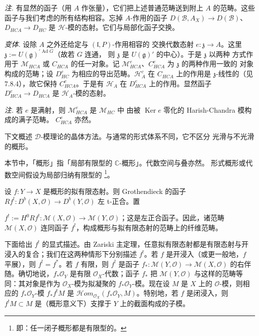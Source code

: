 \emph{注.} 有显然的函子（用 $A$ 作张量），它们把上述普通范畴送到附上 $A$
的范畴。这些函子与我们考虑的所有结构相容。忘掉 $A$-作用的函子
$D(\mathcal{B},A_{X})\to D(\mathcal{B})$、$D_{HCA}\to D_{HC}$ 是
$\mathcal{H}$-模的态射。它们与局部化函子交换。

 \emph{变体.} 设除 $A$ 之外还给定与 $(\mathfrak{l},P)$-作用相容的
交换代数态射 $e:\mathfrak{z}\to A$。这里
$\mathfrak{z}:=U(\mathfrak{g})^{\prime\operatorname{Ad}G}$（故若 $G$ 连通，
则 $\mathfrak{z}$ 是 $U(\mathfrak{g})'$ 的中心）。于是 $\mathfrak{z}$ 以两种
方式作用于 $\mathcal{M}_{HCA}$ 或 $C_{HCA}$ 的任一对象。记
$\mathcal{M}^{e}_{HCA}$、$C^{e}_{HCA}$ 为 $\mathfrak{z}$ 的两种作用一致的
对象构成的范畴；设 $D^{e}_{HC}$ 为相应的导出范畴。$\mathcal{H}^{c}_{A}$ 在
$C_{HCA}$ 上的作用是 $\mathfrak{z}$-线性的（见 7.8.4），故它保持
$C^{e}_{HCA}$。于是有 $\mathcal{H}_{A}$ 在 $D^{e}_{HCA}$ 上的作用。显然函子
$D^{e}_{HCA}\to D_{HCA}$ 是 $\mathcal{H}_{A}$-模的态射。

\emph{注.} 若 $e$ 是满射，则 $\mathcal{M}^{e}_{HCA}$ 是 $\mathcal{M}_{HC}$ 中
由被 $\operatorname{Ker}e$ 零化的 Harish-Chandra 模构成的满子范畴。
$C^{e}_{HCA}$ 亦然。


下文概述 $\mathcal{D}$-模理论的晶体方法。与通常的形式体系不同，它不区分
光滑与不光滑的概形。

本节中，「概形」指「局部有限型的 $\mathbb{C}$-概形」。代数空间与叠亦然。
形式概形或代数空间假设为局部归纳有限型的
\footnote{即：任一闭子概形都是有限型的。}。

 设 $f:Y\to X$ 是概形的拟有限态射。则 Grothendieck 的函子
$Rf^{!}:D^{b}(X,\mathcal{O})\to D^{b}(Y,\mathcal{O})$ 左 t-正合。置



$f^{!}:=H^{0}Rf^{!}:\mathcal{M}(X,\mathcal{O})\to\mathcal{M}(Y,\mathcal{O})$；这是左正合函子。因此，诸范畴 $\mathcal{M}(X,\mathcal{O})$ 连同函子 $f^{!}$，构成概形与拟有限态射的范畴上的纤维范畴。

下面给出 $f^{!}$ 的显式描述。由 Zariski 主定理，任意拟有限态射都是有限态射与开浸入的复合；我们在这两种情形下分别描述 $f^{!}$。若 $f$ 是开浸入（或更一般地，$f$ 平展），则 $f^{!}=f^{*}$。若 $f$ 有限，则 $f^{!}$ 是函子 $f_{*}:\mathcal{M}(Y,\mathcal{O})\to\mathcal{M}(X,\mathcal{O})$ 的右伴随。确切地说，$f_{*}\mathcal{O}_{Y}$ 是有限 $\mathcal{O}_{X}$-代数；函子 $f_{*}$ 把 $\mathcal{M}(Y,\mathcal{O})$ 与这样的范畴等同：其对象是作为 $\mathcal{O}_{X}$-模为拟凝聚的 $f_{*}\mathcal{O}_{Y}$-模。现在设 $M$ 是 $X$ 上的 $\mathcal{O}$-模，则相应的 $f_{*}\mathcal{O}_{Y}$-模 $f_{*}f^{!}M$ 是 $\mathcal{H}om_{\mathcal{O}_{X}}(f_{*}\mathcal{O}_{Y},M)$。特别地，若 $f$ 是闭浸入，则 $f^{!}M\subset M$ 是（概形意义下）支撑于 $Y$ 上的截面构成的子模。

